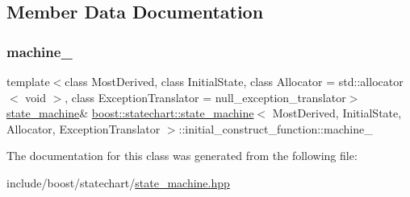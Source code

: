\subsection{Member Data Documentation}
\mbox{\label{classboost_1_1statechart_1_1state__machine_1_1initial__construct__function_a81fd197badaca00fab741883f2d2b92d}} 
\subsubsection{\texorpdfstring{machine\+\_\+}{machine\_}}
{\footnotesize\ttfamily template$<$class Most\+Derived, class Initial\+State, class Allocator = std\+::allocator$<$ void $>$, class Exception\+Translator = null\+\_\+exception\+\_\+translator$>$ \\
\mbox{\hyperlink{classboost_1_1statechart_1_1state__machine}{state\+\_\+machine}}\& \mbox{\hyperlink{classboost_1_1statechart_1_1state__machine}{boost\+::statechart\+::state\+\_\+machine}}$<$ Most\+Derived, Initial\+State, Allocator, Exception\+Translator $>$\+::initial\+\_\+construct\+\_\+function\+::machine\+\_\+\hspace{0.3cm}{\ttfamily [private]}}



The documentation for this class was generated from the following file\+:\begin{DoxyCompactItemize}
\item 
include/boost/statechart/\mbox{\hyperlink{state__machine_8hpp}{state\+\_\+machine.\+hpp}}\end{DoxyCompactItemize}
